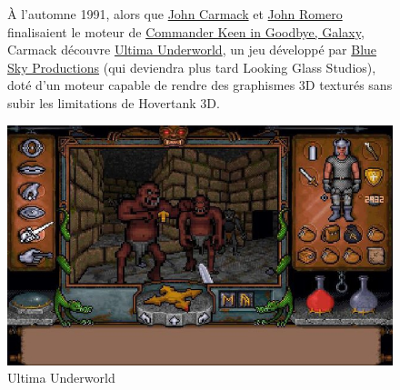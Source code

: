 \documentclass[12pt]{report}
\begin{document}
\begin{figure}[H]
	\begin{minipage}{0.48\textwidth}
		À l'automne 1991, alors que \href{https://fr.wikipedia.org/wiki/John_Carmack}{John Carmack} et 
		\href{https://fr.wikipedia.org/wiki/John_Romero}{John Romero} finalisaient le moteur de 
		\href{https://en.wikipedia.org/wiki/Commander_Keen_in_Goodbye,_Galaxy}{Commander Keen in Goodbye, Galaxy}, Carmack 
		découvre \href{https://fr.wikipedia.org/wiki/Ultima_Underworld}{Ultima Underworld}, un jeu développé par 
		\href{https://fr.wikipedia.org/wiki/Looking_Glass_Studios}{Blue Sky Productions} (qui deviendra plus tard Looking Glass Studios), 
		doté d'un moteur capable de rendre des graphismes 3D 
		texturés sans subir les limitations de Hovertank 3D.
	\end{minipage}\hfill
	\begin{minipage}{0.48\textwidth}
		\centering
		\includegraphics[width=\linewidth]{image/Ultima_Underworld.jpg}
		\caption{Ultima Underworld}
		\label{fig:ultimaunderworld}
	\end{minipage}
\end{figure}
\end{document}
